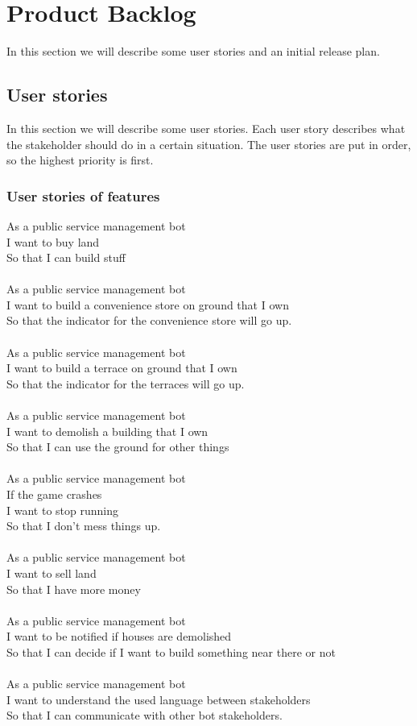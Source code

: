 \section{Product Backlog}
In this section we will describe some user stories and an initial release plan.

\subsection{User stories}
In this section we will describe some user stories. Each user story describes what the stakeholder should do in a certain situation. The user stories are put in order, so the highest priority is first.
\subsubsection{User stories of features}
As a public service management bot\\
I want to buy land\\
So that I can build stuff\\
\\
As a public service management bot\\
I want to build a convenience store on ground that I own\\
So that the indicator for the convenience store will go up.\\
\\
As a public service management bot\\
I want to build a terrace on ground that I own\\
So that the indicator for the terraces will go up.\\
\\
As a public service management bot\\
I want to demolish a building that I own\\
So that I can use the ground for other things\\
\\
As a public service management bot\\
If the game crashes\\
I want to stop running\\
So that I don't mess things up.\\
\\
As a public service management bot\\
I want to sell land\\
So that I have more money\\
\\
As a public service management bot\\
I want to be notified if houses are demolished\\
So that I can decide if I want to build something near there or not\\
\\
As a public service management bot\\
I want to understand the used language between stakeholders\\
So that I can communicate with other bot stakeholders.\\
\\


